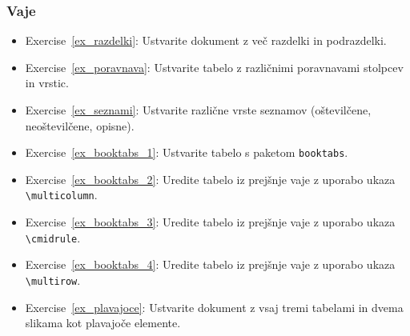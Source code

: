 \subsubsection{Vaje}\label{latexOsnovnaOkolja_vaje}

\begin{itemize}
\item Exercise~\ref{ex_razdelki}: Ustvarite dokument z več razdelki in podrazdelki.
\item Exercise~\ref{ex_poravnava}: Ustvarite tabelo z različnimi poravnavami stolpcev in vrstic.
\item Exercise~\ref{ex_seznami}: Ustvarite različne vrste seznamov (oštevilčene, neoštevilčene, opisne).
\item Exercise~\ref{ex_booktabs_1}: Ustvarite tabelo s paketom \texttt{booktabs}.
\item Exercise~\ref{ex_booktabs_2}: Uredite tabelo iz prejšnje vaje z uporabo ukaza \texttt{{\textbackslash}multicolumn}.
\item Exercise~\ref{ex_booktabs_3}: Uredite tabelo iz prejšnje vaje z uporabo ukaza \texttt{{\textbackslash}cmidrule}.
\item Exercise~\ref{ex_booktabs_4}: Uredite tabelo iz prejšnje vaje z uporabo ukaza \texttt{{\textbackslash}multirow}.
\item Exercise~\ref{ex_plavajoce}: Ustvarite dokument z vsaj tremi tabelami in dvema slikama kot plavajoče elemente.
\end{itemize}

% 
